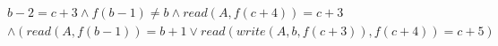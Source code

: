 \begin{align*}
%
& %
b - 2 = c + 3
%
\land
%
f(b - 1)  \neq  b
%
\land
%
\mathit{read}(A,f(c + 4)) = c + 3
~\\~
& %
%
\land
%
(\mathit{read}(A,f(b - 1)) = b + 1 \lor \mathit{read}(\mathit{write}(A,b,f(c + 3)),f(c + 4)) = c + 5)
%
\end{align*}
